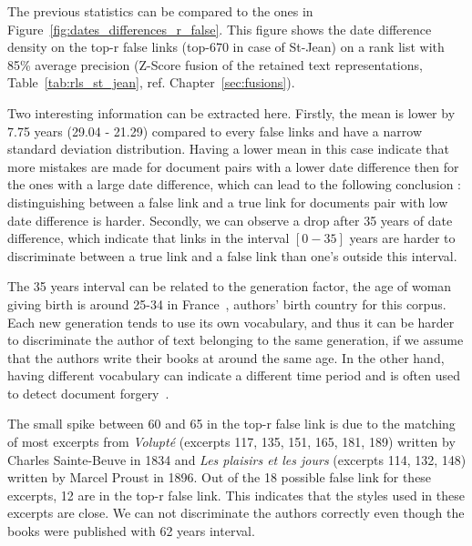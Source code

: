 The previous statistics can be compared to the ones in Figure~\ref{fig:dates_differences_r_false}.
This figure shows the date difference density on the top-r false links (top-670 in case of St-Jean) on a rank list with 85\% average precision (Z-Score fusion of the retained text representations, Table~\ref{tab:rls_st_jean}, ref. Chapter~\ref{sec:fusions}).

Two interesting information can be extracted here.
Firstly, the mean is lower by 7.75 years (29.04 - 21.29) compared to every false links and have a narrow standard deviation distribution.
Having a lower mean in this case indicate that more mistakes are made for document pairs with a lower date difference then for the ones with a large date difference, which can lead to the following conclusion : distinguishing between a false link and a true link for documents pair with low date difference is harder.
Secondly, we can observe a drop after 35 years of date difference, which indicate that links in the interval $\left[0-35\right]$ years are harder to discriminate between a true link and a false link than one's outside this interval.

The 35 years interval can be related to the generation factor, the age of woman giving birth is around 25-34 in France~\cite{generations}, authors' birth country for this corpus.
Each new generation tends to use its own vocabulary, and thus it can be harder to discriminate the author of text belonging to the same generation, if we assume that the authors write their books at around the same age.
In the other hand, having different vocabulary can indicate a different time period and is often used to detect document forgery~\cite{savoy_stylo}.

The small spike between 60 and 65 in the top-r false link is due to the matching of most excerpts from \textit{Volupté} (excerpts 117, 135, 151, 165, 181, 189) written by Charles Sainte-Beuve in 1834 and \textit{Les plaisirs et les jours} (excerpts 114, 132, 148) written by Marcel Proust in 1896.
Out of the 18 possible false link for these excerpts, 12 are in the top-r false link.
This indicates that the styles used in these excerpts are close.
We can not discriminate the authors correctly even though the books were published with 62 years interval.

